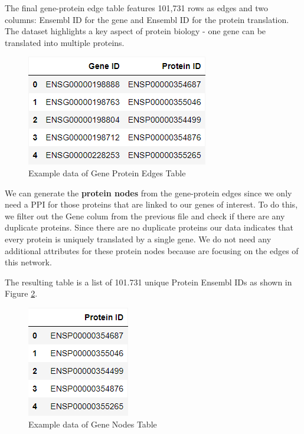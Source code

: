 The final gene-protein edge table features 101,731 rows as edges and two columns:
Ensembl ID for the gene and Ensembl ID for the protein translation.
The dataset highlights a key aspect of protein biology - one gene can be translated into multiple proteins.

\begin{figure}[h]
\centering
\includegraphics[scale=0.5]{figures/03_02_gene_protein_edges}
\caption{Example data of Gene Protein Edges Table}
\label{fig:03_02_gene_protein_edges}
\end{figure}


We can generate the \textbf{protein nodes} from the gene-protein edges
since we only need a PPI for those proteins that are linked to our genes of interest.
To do this, we filter out the Gene colum from the previous file and check if there are any duplicate proteins.
Since there are no duplicate proteins our data indicates that every protein is uniquely translated by a single gene.
We do not need any additional attributes for these protein nodes because are focusing on the edges of this network.

The resulting table is a list of 101.731 unique Protein Ensembl IDs as shown in Figure \ref{fig:03_02_protein_nodes}.
\begin{figure}[h]
\centering
\includegraphics[scale=0.5]{figures/03_02_protein_nodes}
\caption{Example data of Gene Nodes Table}
\label{fig:03_02_protein_nodes}
\end{figure}
\\

